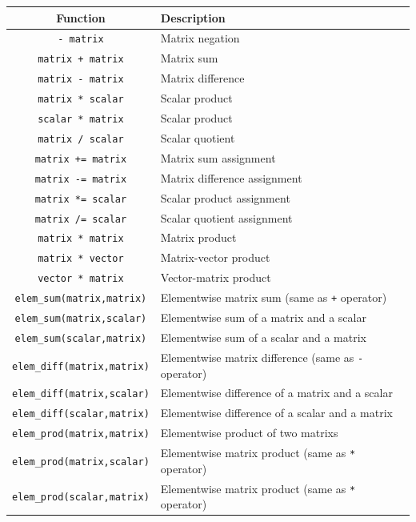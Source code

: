 \begin{table}[t!]\begin{centering}
\begin{tabular}{|c|l|} \hline
Function & Description \\ \hline \hline
\verb#- matrix# & Matrix negation \\ \hline
\verb#matrix + matrix# & Matrix sum \\ \hline
\verb#matrix - matrix# & Matrix difference \\ \hline
\verb#matrix * scalar# & Scalar product \\ \hline
\verb#scalar * matrix# & Scalar product \\ \hline
\verb#matrix / scalar# & Scalar quotient \\ \hline
\verb#matrix += matrix# & Matrix sum assignment \\ \hline
\verb#matrix -= matrix# & Matrix difference assignment \\ \hline
\verb#matrix *= scalar# & Scalar product assignment \\ \hline
\verb#matrix /= scalar# & Scalar quotient assignment \\ \hline
\hline
\verb#matrix * matrix# & Matrix product \\ \hline
\verb#matrix * vector# & Matrix-vector product \\ \hline
\verb#vector * matrix# & Vector-matrix product \\ \hline
\hline
\verb#elem_sum(matrix,matrix)# & Elementwise matrix sum (same as \verb#+# operator) \\ \hline
\verb#elem_sum(matrix,scalar)# & Elementwise sum of a matrix and a scalar \\ \hline
\verb#elem_sum(scalar,matrix)# & Elementwise sum of a scalar and a matrix \\ \hline
\verb#elem_diff(matrix,matrix)# & Elementwise matrix difference (same as \verb#-# operator) \\ \hline
\verb#elem_diff(matrix,scalar)# & Elementwise difference of a matrix and a scalar \\ \hline
\verb#elem_diff(scalar,matrix)# & Elementwise difference of a scalar and a matrix \\ \hline
\verb#elem_prod(matrix,matrix)# & Elementwise product of two matrixs \\ \hline
\verb#elem_prod(matrix,scalar)# & Elementwise matrix product (same as \verb#*# operator) \\ \hline
\verb#elem_prod(scalar,matrix)# & Elementwise matrix product (same as \verb#*# operator) \\ \hline

\end{tabular}
\end{centering}
\end{table}
